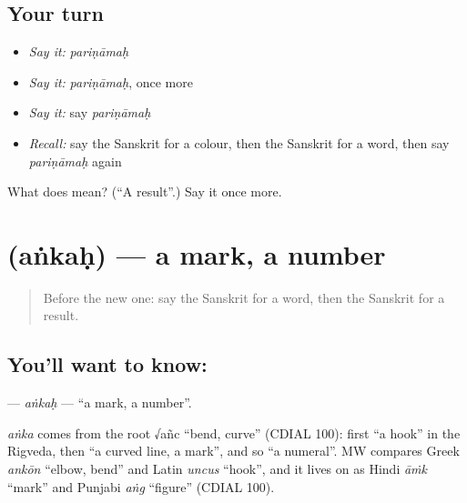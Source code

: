 \subsection*{Your turn}
\begin{itemize}
\raggedright
  \item \emph{Say it:} \emph{pariṇāmaḥ}
  \item \emph{Say it:} \emph{pariṇāmaḥ}, once more
  \item \emph{Say it:} say \emph{pariṇāmaḥ}
  \item \emph{Recall:} say the Sanskrit for a colour, then the Sanskrit for a word, then say \emph{pariṇāmaḥ} again
\end{itemize}

\begin{tcolorbox}[breakable,colback=teal!4,colframe=teal!35!black,title={Before you move on}]
What does  mean? (\textquotedblleft{}A result\textquotedblright{}.) Say it once more.
\end{tcolorbox}
\section[\texorpdfstring{\sk{अंकः} (aṅkaḥ)}{अंकः (aṅkaḥ)}]{ (aṅkaḥ) — a mark, a number}

\label{lesson:SA-C169-ankah}



\begin{quote}
Before the new one: say the Sanskrit for a word, then the Sanskrit for a result.
\end{quote}

\subsection*{You'll want to know: }
\textbf{} — \emph{aṅkaḥ} — \textquotedblleft{}a mark, a number\textquotedblright{}.

\begin{cousinweb}
\emph{aṅka} comes from the root √añc \textquotedblleft{}bend, curve\textquotedblright{} (CDIAL 100): first \textquotedblleft{}a hook\textquotedblright{} in the Rigveda, then \textquotedblleft{}a curved line, a mark\textquotedblright{}, and so \textquotedblleft{}a numeral\textquotedblright{}. MW compares Greek \emph{ankōn} \textquotedblleft{}elbow, bend\textquotedblright{} and Latin \emph{uncus} \textquotedblleft{}hook\textquotedblright{}, and it lives on as Hindi \emph{āṁk} \textquotedblleft{}mark\textquotedblright{} and Punjabi \emph{aṅg} \textquotedblleft{}figure\textquotedblright{} (CDIAL 100).
\end{cousinweb}

